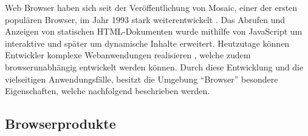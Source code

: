 Web Browser haben sich seit der Veröffentlichung von Mosaic, einer der ersten populären Browser, im Jahr 1993 stark weiterentwickelt \cite{EvolutionOfTheWebBrowser}. Das Abrufen und Anzeigen von statischen HTML-Dokumenten wurde mithilfe von JavaScript um interaktive und später um dynamische Inhalte erweitert. Heutzutage können Entwickler komplexe Webanwendungen realisieren \cite{SinglePageApplication}, welche zudem browserunabhängig entwickelt werden können. Durch diese Entwicklung und die vielseitigen Anwendungsfälle, besitzt die Umgebung \enquote{Browser} besondere Eigenschaften, welche nachfolgend beschrieben werden.

\subsection{Browserprodukte}
\label{sec:browserprodukte}


